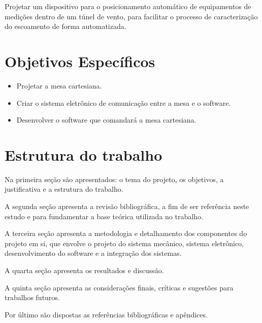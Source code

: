 Projetar um dispositivo para o posicionamento automático de equipamentos de medições dentro de um túnel de vento, 
para facilitar o processo de caracterização do escoamento de forma automatizada.

\section{Objetivos Específicos}\label{sec:objetivoesp}

	\begin{itemize}
		\item Projetar a mesa cartesiana.
		\item Criar o sistema eletrônico de comunicação entre a mesa e o software.
		\item Desenvolver o software que comandará a mesa cartesiana.
	\end{itemize}

\section{Estrutura do trabalho}\label{sec:estruturatrab}

Na primeira seção são apresentados: o tema do projeto, os objetivos, 
a justificativa e a estrutura do trabalho.

A segunda seção apresenta a revisão bibliográfica, a fim de ser referência neste estudo e para fundamentar 
a base teórica utilizada no trabalho.

A terceira seção apresenta a metodologia e detalhamento dos componentes do projeto em si, 
que envolve o projeto do sistema mecânico, sistema eletrônico, desenvolvimento do software 
e a integração dos sistemas.

A quarta seção apresenta os resultados e discussão.

A quinta seção apresenta as considerações finais, críticas e sugestões para trabalhos futuros.

Por último são dispostas as referências bibliográficas e apêndices.